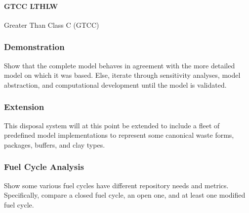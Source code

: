 \paragraph{GTCC LTHLW}  Greater Than Class C (GTCC)


\subsubsection{Demonstration}

Show that the complete model behaves in agreement with the more detailed model 
on which it was based. Else, iterate through sensitivity analyses, model 
abstraction, and computational development until the model is validated. 



\subsubsection{Extension}

This disposal system will at this point be extended to include a fleet of 
predefined model implementations to represent some canonical waste forms, 
packages, buffers, and clay types.  

\subsubsection{Fuel Cycle Analysis}

Show some various fuel cycles have different repository needs and metrics.  
Specifically, compare a closed fuel cycle, an open one, and at least one 
modified fuel cycle. 





